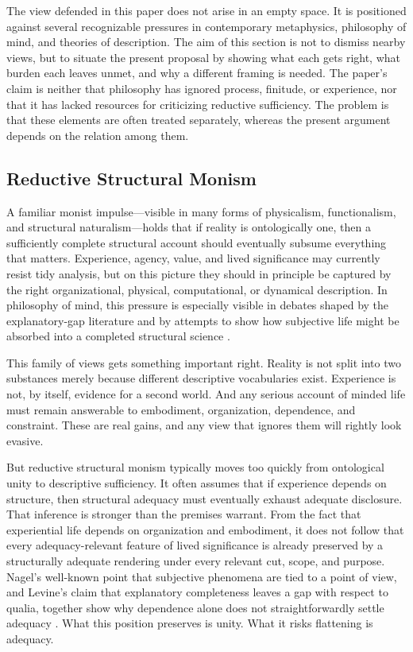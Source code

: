 \documentclass[11pt]{article}
\begin{document}
The view defended in this paper does not arise in an empty space. It is positioned against several recognizable pressures in contemporary metaphysics, philosophy of mind, and theories of description. The aim of this section is not to dismiss nearby views, but to situate the present proposal by showing what each gets right, what burden each leaves unmet, and why a different framing is needed. The paper's claim is neither that philosophy has ignored process, finitude, or experience, nor that it has lacked resources for criticizing reductive sufficiency. The problem is that these elements are often treated separately, whereas the present argument depends on the relation among them.

\subsection{Reductive Structural Monism}

A familiar monist impulse---visible in many forms of physicalism, functionalism, and structural naturalism---holds that if reality is ontologically one, then a sufficiently complete structural account should eventually subsume everything that matters. Experience, agency, value, and lived significance may currently resist tidy analysis, but on this picture they should in principle be captured by the right organizational, physical, computational, or dynamical description. In philosophy of mind, this pressure is especially visible in debates shaped by the explanatory-gap literature and by attempts to show how subjective life might be absorbed into a completed structural science \cite{Levine1983,Chalmers1995}.

This family of views gets something important right. Reality is not split into two substances merely because different descriptive vocabularies exist. Experience is not, by itself, evidence for a second world. And any serious account of minded life must remain answerable to embodiment, organization, dependence, and constraint. These are real gains, and any view that ignores them will rightly look evasive.

But reductive structural monism typically moves too quickly from ontological unity to descriptive sufficiency. It often assumes that if experience depends on structure, then structural adequacy must eventually exhaust adequate disclosure. That inference is stronger than the premises warrant. From the fact that experiential life depends on organization and embodiment, it does not follow that every adequacy-relevant feature of lived significance is already preserved by a structurally adequate rendering under every relevant cut, scope, and purpose. Nagel's well-known point that subjective phenomena are tied to a point of view, and Levine's claim that explanatory completeness leaves a gap with respect to qualia, together show why dependence alone does not straightforwardly settle adequacy \cite{Nagel1974,Levine1983}. What this position preserves is unity. What it risks flattening is adequacy.
\end{document}
